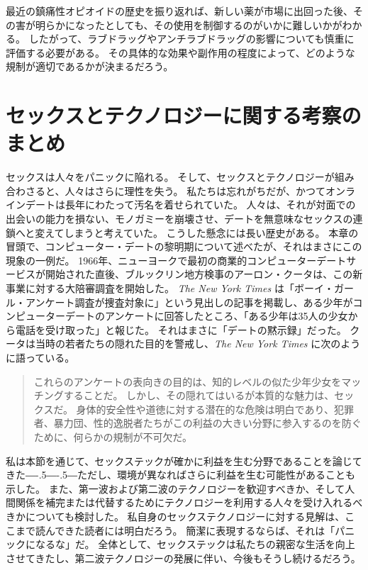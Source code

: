 \documentclass[paper=a4,book,openany]{jlreq}
\newcommand{\ig}[1]{}           %
\def\DDASH{―\kern-.5\zw―\kern-.5\zw―} %
\begin{document}
最近の鎮痛性オピオイドの歴史を振り返れば、新しい薬が市場に出回った後、その害が明らかになったとしても、その使用を制御するのがいかに難しいかがわかる。
したがって、ラブドラッグやアンチラブドラッグの影響についても慎重に評価する必要がある。
その具体的な効果や副作用の程度によって、どのような規制が適切であるかが決まるだろう。

\section{セックスとテクノロジーに関する考察のまとめ}

セックスは人々をパニックに陥れる。
そして、セックスとテクノロジーが組み合わさると、人々はさらに理性を失う。
私たちは忘れがちだが、かつてオンラインデートは長年にわたって汚名を着せられていた。
人々は、それが対面での出会いの能力を損ない、モノガミーを崩壊させ、デートを無意味なセックスの連鎖へと変えてしまうと考えていた。
こうした懸念には長い歴史がある。
本章の冒頭で、コンピューター・デートの黎明期について述べたが、それはまさにこの現象の一例だ。
1966年、ニューヨークで最初の商業的コンピューターデートサービスが開始された直後、ブルックリン地方検事のアーロン・クータ\ig{Aaron E. Koota}は、この新事業に対する大陪審調査を開始した。
\emph{The New York Times} は「ボーイ・ガール・アンケート調査が捜査対象に」という見出しの記事を掲載し、ある少年がコンピューターデートのアンケートに回答したところ、「ある少年は35人の少女から電話を受け取った」と報じた。
それはまさに「デートの黙示録」だった。
クータは当時の若者たちの隠れた目的を警戒し、\emph{The New York Times} に次のように語っている。

\begin{quote}
  これらのアンケートの表向きの目的は、知的レベルの似た少年少女をマッチングすることだ。
しかし、その隠れてはいるが本質的な魅力は、セックスだ。
身体的安全性や道徳に対する潜在的な危険は明白であり、犯罪者、暴力団、性的逸脱者たちがこの利益の大きい分野に参入するのを防ぐために、何らかの規制が不可欠だ。
\citep{anderson66:_boy_girl_quest_inves}\ig{David Anderson}
\end{quote}

私は本節を通じて、セックステックが確かに利益を生む分野であることを論じてきた{\DDASH}ただし、環境が異なればさらに利益を生む可能性があることも示した。
また、第一波および第二波のテクノロジーを歓迎すべきか、そして人間関係を補完または代替するためにテクノロジーを利用する人々を受け入れるべきかについても検討した。
私自身のセックステクノロジーに対する見解は、ここまで読んできた読者には明白だろう。
簡潔に表現するならば、それは「パニックになるな」だ。
全体として、セックステックは私たちの親密な生活を向上させてきたし、第二波テクノロジーの発展に伴い、今後もそうし続けるだろう。
\end{document}
